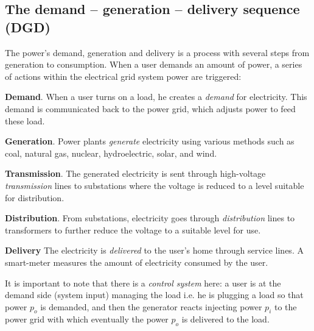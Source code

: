 \documentclass[11pt, a4paper]{article}
\theoremstyle{definition}
\theoremstyle{plain}
\theoremstyle{plain}
\theoremstyle{remark}
\theoremstyle{remark}
\theoremstyle{remark}
\begin{document}
{\color{blue}
	
	
	
	\subsection*{The demand -- generation -- delivery sequence (DGD)}
	
	
	The power's demand, generation and delivery is a process with several steps from generation to consumption. When a user demands an amount of power, a series of actions within the electrical grid system power are triggered:
	
	\textbf{Demand}. When a user turns on a load, he creates a \textit{demand} for electricity. This demand is communicated back to the power grid, which adjusts power to feed these load.
	
	\textbf{Generation}. Power plants \textit{generate} electricity using various methods such as coal, natural gas, nuclear, hydroelectric, solar, and wind. 
	
	\textbf{Transmission}. The generated electricity is sent through high-voltage \textit{transmission} lines to substations where the voltage is reduced to a level suitable for distribution.
	
	\textbf{Distribution}. From substations, electricity goes through \textit{distribution} lines to transformers to further reduce the voltage to a suitable level for use.
	
	\textbf{Delivery} The electricity is \textit{delivered} to the user’s home through service lines. A smart-meter measures the amount of electricity consumed by the user.
	
	It is important to note that there is a \textit{control system} \cite[Sec. 1.2]{bakshi2013} here: a user is at the demand side (system input) managing the load i.e. he is plugging a load so that power $p_o$ is demanded, and then the generator reacts injecting power $p_i$ to the power grid with which eventually the power $ p_o $ is delivered to the load. 
	
}
\end{document}
